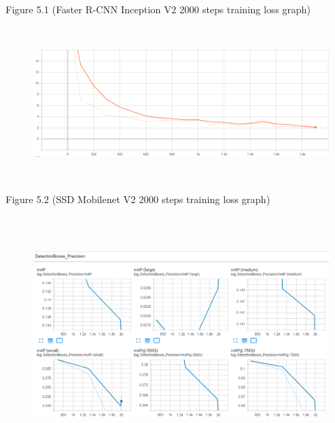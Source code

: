 \documentclass[12pt]{report}
\renewcommand{\_}{\kern-1.5pt\textunderscore\kern-1.5pt}
\begin{document}

\par

\begin{FlushRight}
Figure 5.1 (Faster R-CNN Inception V2 2000 steps training loss graph)
\end{FlushRight}\par




\begin{figure}[H]
	\begin{Center}
		\includegraphics[width=6.27in,height=2.29in]{./media/image9.png}
	\end{Center}
\end{figure}



\par

\begin{FlushRight}
Figure 5.2 (SSD Mobilenet V2 2000 steps training loss graph)
\end{FlushRight}\par




\begin{figure}[H]
	\begin{Center}
		\includegraphics[width=6.27in,height=3.53in]{./media/image3.png}
	\end{Center}
\end{figure}
\end{document}
